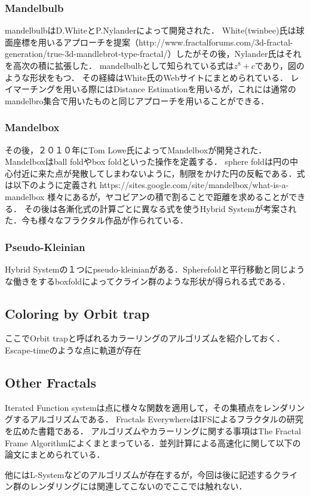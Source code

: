 \subsubsection{Mandelbulb}
mandelbulbはD.WhiteとP.Nylanderによって開発された．
White(twinbee)氏は球面座標を用いるアプローチを提案（http://www.fractalforums.com/3d-fractal-generation/true-3d-mandlebrot-type-fractal/）したがその後，Nylander氏はそれを高次の積に拡張した．
mandelbulbとして知られている式は$z^8 + c $であり，図のような形状をもつ．
その経緯はWhite氏のWebサイトにまとめられている．
レイマーチングを用いる際にはDistance Estimationを用いるが，これには通常のmandelbro集合で用いたものと同じアプローチを用いることができる．

\subsubsection{Mandelbox}
その後，２０１０年にTom Lowe氏によってMandelboxが開発された．
Mandelboxはball foldやbox foldといった操作を定義する．
sphere foldは円の中心付近に来た点が発散してしまわないように，制限をかけた円の反転である．式は以下のように定義され
https://sites.google.com/site/mandelbox/what-is-a-mandelbox
様々にあるが，ヤコビアンの積で割ることで距離を求めることができる．
その後は各漸化式の計算ごとに異なる式を使うHybrid Systemが考案された．今も様々なフラクタル作品が作られている．

\subsubsection{Pseudo-Kleinian}
Hybrid Systemの１つにpseudo-kleinianがある．Spherefoldと平行移動と同じような働きをするboxfoldによってクライン群のような形状が得られる式である．

\subsection{Coloring by Orbit trap}

ここでOrbit trapと呼ばれるカラーリングのアルゴリズムを紹介しておく．Escape-timeのような点に軌道が存在

\subsection{Other Fractals}

Iterated Function systemは点に様々な関数を適用して，その集積点をレンダリングするアルゴリズムである．
Fractals EverywhereはIFSによるフラクタルの研究を広めた書籍である．
アルゴリズムやカラーリングに関する事項はThe Fractal Frame Algorithmによくまとまっている．並列計算による高速化に関して以下の論文にまとめられている．

他にはL-Systemなどのアルゴリズムが存在するが，今回は後に記述するクライン群のレンダリングには関連してこないのでここでは触れない．



